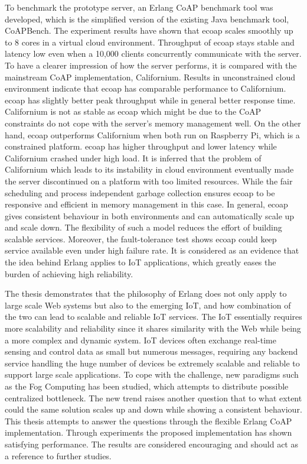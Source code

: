 To benchmark the prototype server, an Erlang CoAP benchmark tool was developed, which is the simplified version of the existing Java benchmark tool, CoAPBench. The experiment results have shown that ecoap scales smoothly up to 8 cores in a virtual cloud environment. Throughput of ecoap stays stable and latency low even when a 10,000 clients concurrently communicate with the server. To have a clearer impression of how the server performs, it is compared with the mainstream CoAP implementation, Californium. Results in unconstrained cloud environment indicate that ecoap has comparable performance to Californium. ecoap has slightly better peak throughput while in general better response time. Californium is not as stable as ecoap which might be due to the CoAP constraints do not cope with the server's memory management well. 
On the other hand, ecoap outperforms Californium when both run on Raspberry Pi, which is a constrained platform. ecoap has higher throughput and lower latency while Californium crashed under high load. It is inferred that the problem of Californium which leads to its instability in cloud environment eventually made the server discontinued on a platform with too limited resources. While the fair scheduling and process independent garbage collection ensures ecoap to be responsive and efficient in memory management in this case. In general, ecoap gives consistent behaviour in both environments and can automatically scale up and scale down. The flexibility of such a model reduces the effort of building scalable services. Moreover, the fault-tolerance test 
shows ecoap could keep service available even under high failure rate. It is considered as an evidence that the idea behind Erlang applies to IoT applications, which greatly eases the burden of achieving high reliability.

The thesis demonstrates that the philosophy of Erlang does not only apply to large scale Web systems but also to the emerging IoT, and how combination of the two can lead to scalable and reliable IoT services. The IoT essentially requires more scalability and reliability since it shares similarity with the Web while being a more complex and dynamic system. IoT devices often exchange real-time sensing and control data as small but numerous messages, requiring any backend service handling the huge number of devices be extremely scalable and reliable to support large scale applications. To cope with the challenge, new paradigms such as the Fog Computing has been studied, which attempts to distribute possible centralized bottleneck. The new trend raises another question that to what extent could the same solution scales up and down while showing a consistent behaviour. This thesis attempts to answer the questions through the flexible Erlang CoAP implementation. Through experiments the proposed implementation has shown satisfying performance. The results are considered encouraging and should act as a reference to further studies.

